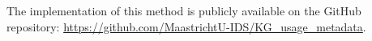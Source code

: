 \documentclass[sw]{iosart2x}
\begin{document}
The implementation of this method is publicly available on the GitHub repository: \url{https://github.com/MaastrichtU-IDS/KG_usage_metadata}.

\end{document}
